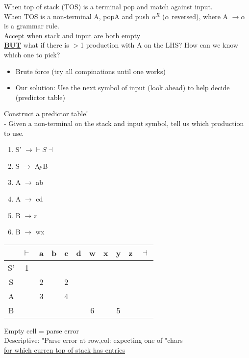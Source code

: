 \documentclass[12pt]{article}
\newcommand{\myt}[1]{\textbf{\underline{#1}}}
\begin{document}
	When top of stack (TOS) is a terminal pop and match against input.\\
	When TOS is a non-terminal A, popA and push $\alpha^R$ ($\alpha$ reversed), where A $\rightarrow \alpha$ is a grammar rule. \\
	Accept when stack and input are both empty\\
	
	\myt{BUT} what if there is $>$1 production with A on the LHS? How can we know which one to pick?\\
	
	\begin{itemize}
		\item Brute force (try all compinations until one works)
		\item Our solution: Use the next symbol of input (look ahead) to help decide (predictor table)
	\end{itemize}
	
	Construct a predictor table!\\
	- Given a non-terminal on the stack and input symbol, tell us which production to use.\\
	
	\begin{enumerate}
	\item S' $\rightarrow \vdash S \dashv$
	\item S $\rightarrow$ AyB
	\item A $\rightarrow$ ab
	\item A $\rightarrow$ cd
	\item B $\rightarrow z$
	\item B $\rightarrow$ wx
	\end{enumerate}
	
	\begin{tabular}{c | c  c  c  c  c  c  c  c  c c}
		& $\vdash$ & a & b & c & d & w & x & y & z & $\dashv$ \\ \hline
		S' & 1 & & & & & & & & & \\
		S & & 2 & & 2 & & & & & & \\
		A & & 3 & & 4 & & & & & & \\
		B & & & & & & 6 & & 5 & & \\ 
	\end{tabular}
	
	Empty cell = parse error\\
	
	Descriptive: "Parse error at row,col: expecting one of "chars \\
	\underline{for which curren top of stack has entries}\\
	
\end{document}
